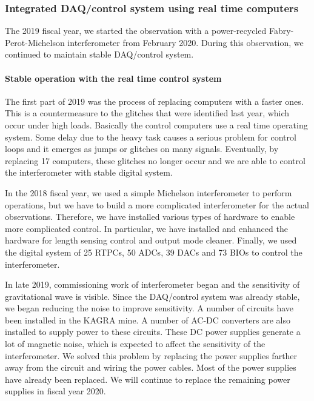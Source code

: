 %
%


\vspace{10pt}
\subsubsection*{\bf  Integrated DAQ/control system using real time computers}
\vspace{3pt}

\vspace{3pt}

\vspace{3pt}


The 2019 fiscal year, we started the observation with a power-recycled Fabry-Perot-Michelson interferometer from February 2020. During this observation, we continued to maintain stable DAQ/control system.

\paragraph*{\bi Stable operation with the real time control system}

The first part of 2019 was the process of replacing computers with a faster ones. This is a countermeasure to the glitches that were identified last year, which occur under high loads. Basically the control computers use a real time operating system. Some delay due to the heavy task causes a serious problem for control loops and it emerges as jumps or glitches on many signals. Eventually, by replacing 17 computers, these glitches no longer occur and we are able to control the interferometer with stable digital system.

In the 2018 fiscal year, we used a simple Michelson interferometer to perform operations, but we have to build a more complicated interferometer for the actual observations. Therefore, we have installed various types of hardware to enable more complicated control. In particular, we have installed and enhanced the hardware for length sensing control and output mode cleaner. Finally, we used the digital system of 25 RTPCs, 50 ADCs, 39 DACs and 73 BIOs to control the interferometer.

In late 2019, commissioning work of interferometer began and the sensitivity of gravitational wave is visible. Since the DAQ/control system was already stable, we began reducing the noise to improve sensitivity. A number of circuits have been installed in the KAGRA mine. A number of AC-DC converters are also installed to supply power to these circuits. These DC power supplies generate a lot of magnetic noise, which is expected to affect the sensitivity of the interferometer. We solved this problem by replacing the power supplies farther away from the circuit and wiring the power cables. Most of the power supplies have already been replaced. We will continue to replace the remaining power supplies in fiscal year 2020.




%




